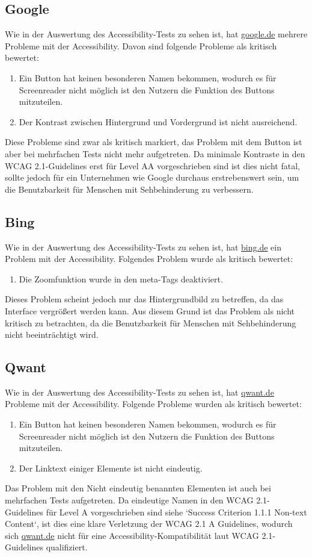 
\subsection{Google}\label{subsec:google}
Wie in der Auswertung des Accessibility-Tests zu sehen ist, hat \url{google.de} mehrere Probleme mit der Accessibility.
Davon sind folgende Probleme als kritisch bewertet:
\begin{enumerate}
    \item Ein Button hat keinen besonderen Namen bekommen, wodurch es für Screenreader nicht möglich ist den Nutzern die Funktion des Buttons mitzuteilen.
    \item Der Kontrast zwischen Hintergrund und Vordergrund ist nicht ausreichend.
\end{enumerate}
Diese Probleme sind zwar als kritisch markiert, das Problem mit dem Button ist aber bei mehrfachen Tests nicht mehr aufgetreten.
Da minimale Kontraste in den WCAG 2.1-Guidelines erst für Level AA vorgeschrieben sind ist dies nicht fatal, sollte jedoch für ein Unternehmen wie Google durchaus erstrebenswert sein,
um die Benutzbarkeit für Menschen mit Sehbehinderung zu verbessern.

\subsection{Bing}\label{subsec:bing}
Wie in der Auswertung des Accessibility-Tests zu sehen ist, hat \url{bing.de} ein Problem mit der Accessibility.
Folgendes Problem wurde als kritisch bewertet:
\begin{enumerate}
    \item Die Zoomfunktion wurde in den meta-Tags deaktiviert.
\end{enumerate}
Dieses Problem scheint jedoch nur das Hintergrundbild zu betreffen, da das Interface vergrößert werden kann.
Aus diesem Grund ist das Problem als nicht kritisch zu betrachten, da die Benutzbarkeit für Menschen mit Sehbehinderung nicht beeinträchtigt wird.

\subsection{Qwant}\label{subsec:qwant}
Wie in der Auswertung des Accessibility-Tests zu sehen ist, hat \url{qwant.de} Probleme mit der Accessibility.
Folgende Probleme wurden als kritisch bewertet:
\begin{enumerate}
    \item Ein Button hat keinen besonderen Namen bekommen, wodurch es für Screenreader nicht möglich ist den Nutzern die Funktion des Buttons mitzuteilen.
    \item Der Linktext einiger Elemente ist nicht eindeutig.
\end{enumerate}
Das Problem mit den Nicht eindeutig benannten Elementen ist auch bei mehrfachen Tests aufgetreten.
Da eindeutige Namen in den WCAG 2.1-Guidelines für Level A vorgeschrieben sind siehe `Success Criterion 1.1.1 Non-text Content`\cite{WCAG21},
ist dies eine klare Verletzung der WCAG 2.1 A Guidelines, wodurch sich \url{qwant.de} nicht für eine Accessibility-Kompatibilität laut WCAG 2.1-Guidelines qualifiziert.

